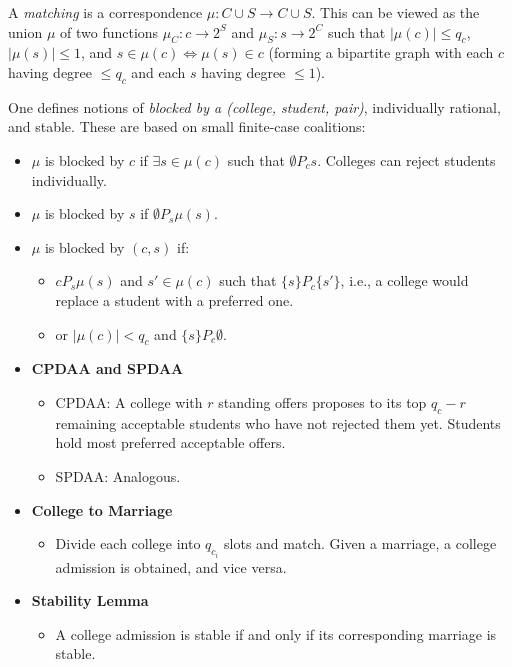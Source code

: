 \documentclass[8pt]{scrartcl}
\newcommand{\abs}[1]{\left|#1\right|}
\begin{document}
\begin{multicols*}{2}
A \textit{matching} is a correspondence $\mu: C \cup S \to C \cup S$. This can be viewed as the union $\mu$ of two functions $\mu_C: c \to 2^S$ and $\mu_S: s \to 2^C$ such that $\abs{\mu(c)} \leq q_c$, $\abs{\mu(s)} \leq 1$, and $s \in \mu(c) \iff \mu(s) \in c$ (forming a bipartite graph with each $c$ having degree $\leq q_c$ and each $s$ having degree $\leq 1$).

One defines notions of \textit{blocked by a (college, student, pair)}, individually rational, and stable. These are based on small finite-case coalitions:
\begin{itemize}
    \item $\mu$ is blocked by $c$ if $\exists s \in \mu(c)$ such that $\emptyset P_c s$. Colleges can reject students individually.
    \item $\mu$ is blocked by $s$ if $\emptyset P_s \mu(s)$.
    \item $\mu$ is blocked by $(c, s)$ if:
    \begin{itemize}
        \item $c P_s \mu(s)$ and $s' \in \mu(c)$ such that $\{s\} P_c \{s'\}$, i.e., a college would replace a student with a preferred one.
        \item or $\abs{\mu(c)} < q_c$ and $\{s\} P_c \emptyset$.
    \end{itemize}
\end{itemize}

\begin{itemize}
    \item \textbf{CPDAA and SPDAA}
    \begin{itemize}
        \item CPDAA: A college with $r$ standing offers proposes to its top $q_c - r$ remaining acceptable students who have not rejected them yet. Students hold most preferred acceptable offers.
        \item SPDAA: Analogous.
    \end{itemize}
    \item \textbf{College to Marriage}
    \begin{itemize}
        \item Divide each college into $q_{c_i}$ slots and match. Given a marriage, a college admission is obtained, and vice versa.
    \end{itemize}
    \item \textbf{Stability Lemma}
    \begin{itemize}
        \item A college admission is stable if and only if its corresponding marriage is stable.
    \end{itemize}
\end{itemize}


\end{multicols*}
\end{document}
